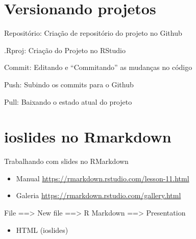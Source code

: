 \documentclass[
  10pt,
  ignorenonframetext,
]{beamer}
\providecommand{\tightlist}{%
  \setlength{\itemsep}{0pt}\setlength{\parskip}{0pt}}
\begin{document}
\hypertarget{versionando-projetos}{%
\section{Versionando projetos}\label{versionando-projetos}}

\begin{frame}{}
\protect\hypertarget{section-12}{}
\end{frame}

\begin{frame}{Repositório: Criação de repositório do projeto no Github}
\protect\hypertarget{reposituxf3rio-criauxe7uxe3o-de-reposituxf3rio-do-projeto-no-github}{}
\end{frame}

\begin{frame}{.Rproj: Criação do Projeto no RStudio}
\protect\hypertarget{rproj-criauxe7uxe3o-do-projeto-no-rstudio}{}
\end{frame}

\begin{frame}{Commit: Editando e ``Commitando'' as mudanças no código}
\protect\hypertarget{commit-editando-e-commitando-as-mudanuxe7as-no-cuxf3digo}{}
\end{frame}

\begin{frame}{Push: Subindo os commits para o Github}
\protect\hypertarget{push-subindo-os-commits-para-o-github}{}
\end{frame}

\begin{frame}{Pull: Baixando o estado atual do projeto}
\protect\hypertarget{pull-baixando-o-estado-atual-do-projeto}{}
\end{frame}

\hypertarget{ioslides-no-rmarkdown}{%
\section{ioslides no Rmarkdown}\label{ioslides-no-rmarkdown}}

\begin{frame}{Trabalhando com slides no RMarkdown}
\protect\hypertarget{trabalhando-com-slides-no-rmarkdown}{}
\begin{itemize}
\item
  Manual \url{https://rmarkdown.rstudio.com/lesson-11.html}
\item
  Galeria \url{https://rmarkdown.rstudio.com/gallery.html}
\end{itemize}

File ==\textgreater{} New file ==\textgreater{} R Markdown
==\textgreater{} Presentation

\begin{itemize}
\tightlist
\item
  HTML (ioslides)
\end{itemize}
\end{frame}
\end{document}

